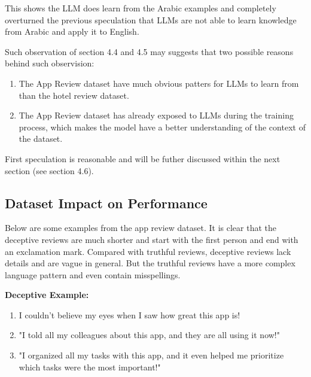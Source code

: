 \documentclass[sigconf, nonacm]{acmart}
\newenvironment{example}
{\begin{mdframed}[
    linecolor=exampleborder,
    linewidth=0.5pt,
    backgroundcolor=examplecolor,
    topline=false,
    bottomline=false,
    leftline=true,
    rightline=false,
    innertopmargin=2pt,
    innerbottommargin=2pt,
    innerleftmargin=5pt,
    innerrightmargin=5pt,
    skipabove=10pt,
    skipbelow=10pt
]}
{\end{mdframed}}
\theoremstyle{definition}
\begin{document}
This shows the LLM does learn from the Arabic examples and completely overturned the previous speculation that LLMs are not able to learn knowledge from Arabic and apply it to English.

Such observation of section 4.4 and 4.5 may suggests that two possible reasons behind such observision:
\begin{enumerate}
  \item The App Review dataset have much obvious patters for LLMs to learn from than the hotel review dataset.
  \item The App Review dataset has already exposed to LLMs during the training process, which makes the model have a better understanding of the context of the dataset.
\end{enumerate}

First speculation is reasonable and will be futher discussed within the next section (see section 4.6).

\subsection{Dataset Impact on Performance}

Below are some examples from the app review dataset. It is clear that the deceptive reviews are much shorter and start with the first person and end with an exclamation mark. Compared with truthful reviews, deceptive reviews lack details and are vague in general. But the truthful reviews have a more complex language pattern and even contain misspellings.

\begin{example}
  \textbf{Deceptive Example:}
  \begin{enumerate}
    \item I couldn’t believe my eyes when I saw how great this app is!
    \item "I told all my colleagues about this app, and they are all using it now!"
    \item "I organized all my tasks with this app, and it even helped me prioritize which tasks were the most important!"
  \end{enumerate}
\end{example}
\end{document}
